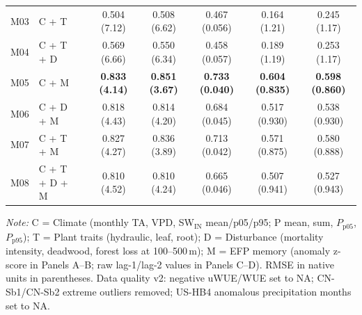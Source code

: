 \begin{table}[htbp]
\begin{tabular}{llcccccc}
M03 & C + T &  & 0.504 (7.12) & 0.508 (6.62) & 0.467 (0.056) & 0.164 (1.21) & 0.245 (1.17) \\
M04 & C + T + D &  & 0.569 (6.66) & 0.550 (6.34) & 0.458 (0.057) & 0.189 (1.19) & 0.253 (1.17) \\
M05 & C + M &  & \textbf{0.833 (4.14)} & \textbf{0.851 (3.67)} & \textbf{0.733 (0.040)} & \textbf{0.604 (0.835)} & \textbf{0.598 (0.860)} \\
M06 & C + D + M &  & 0.818 (4.43) & 0.814 (4.20) & 0.684 (0.045) & 0.517 (0.930) & 0.538 (0.930) \\
M07 & C + T + M &  & 0.827 (4.27) & 0.836 (3.89) & 0.713 (0.042) & 0.571 (0.875) & 0.580 (0.888) \\
M08 & C + T + D + M &  & 0.810 (4.52) & 0.810 (4.24) & 0.665 (0.046) & 0.507 (0.941) & 0.527 (0.943) \\
\midrule
\bottomrule
\end{tabular}
\vspace{2pt}
\begin{minipage}{\linewidth}
\footnotesize
\textit{Note:} C = Climate (monthly TA, VPD, SW$_\mathrm{IN}$ mean/p05/p95;
P mean, sum, $P_\mathrm{p05}$, $P_\mathrm{p95}$); T = Plant traits (hydraulic, leaf, root);
D = Disturbance (mortality intensity, deadwood, forest loss at 100--500\,m);
M = EFP memory (anomaly z-score in Panels A--B; raw lag-1/lag-2 values in Panels C--D).
RMSE in native units in parentheses. Data quality v2: negative uWUE/WUE set to NA;
CN-Sb1/CN-Sb2 extreme outliers removed; US-HB4 anomalous precipitation months set to NA.
\end{minipage}
\end{table}

